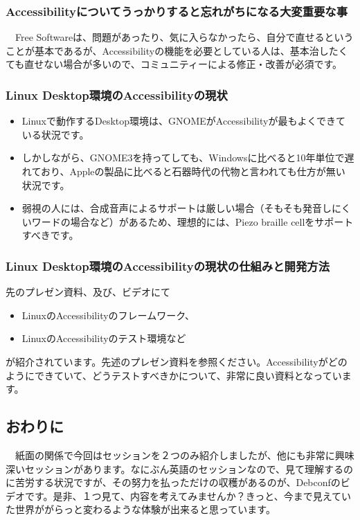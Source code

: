 \documentclass[mingoth,a4paper]{jsarticle}
\begin{document}
\subsubsection{Accessibilityについてうっかりすると忘れがちになる大変重要な事}

　Free Softwareは、問題があったり、気に入らなかったら、自分で直せるということが基本であるが、Accessibilityの機能を必要としている人は、基本治したくても直せない場合が多いので、コミュニティーによる修正・改善が必須です。

\subsubsection{Linux Desktop環境のAccessibilityの現状}

\begin{itemize}
  \item Linuxで動作するDesktop環境は、GNOMEがAccessibilityが最もよくできている状況です。
  \item しかしながら、GNOME3を持ってしても、Windowsに比べると10年単位で遅れており、Appleの製品に比べると石器時代の代物と言われても仕方が無い状況です。
  \item 弱視の人には、合成音声によるサポートは厳しい場合（そもそも発音しにくいワードの場合など）があるため、理想的には、Piezo braille cellをサポートすべきです。
\end{itemize}

\subsubsection{Linux Desktop環境のAccessibilityの現状の仕組みと開発方法}

先のプレゼン資料、及び、ビデオにて

\begin{itemize}
  \item LinuxのAccessibilityのフレームワーク、
  \item LinuxのAccessibilityのテスト環境など
 \end{itemize}

が紹介されています。先述のプレゼン資料を参照ください。Accessibilityがどのようにできていて、どうテストすべきかについて、非常に良い資料となっています。

\subsection{おわりに}

　紙面の関係で今回はセッションを２つのみ紹介しましたが、他にも非常に興味深いセッションがあります。なにぶん英語のセッションなので、見て理解するのに苦労する状況ですが、その努力を払っただけの収穫があるのが、Debconfのビデオです。是非、１つ見て、内容を考えてみませんか？きっと、今まで見えていた世界ががらっと変わるような体験が出来ると思っています。
\end{document}
